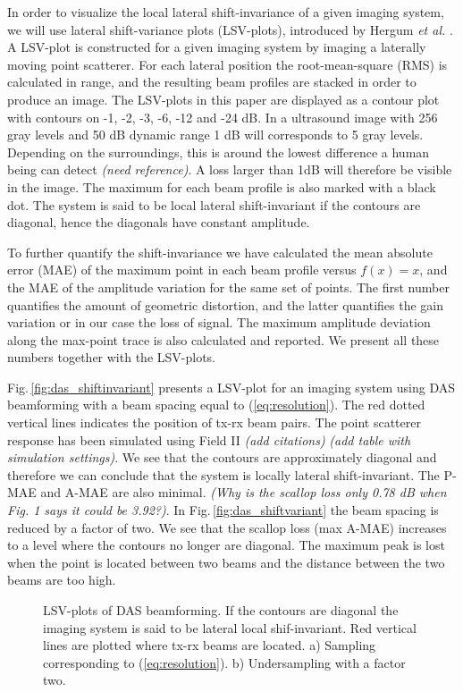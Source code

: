 \documentclass[journal]{IEEEtran}
\newcommand{\img}{img/}
\newcommand\comment[1]{\textit{{\color{red}(#1)}}}
\begin{document}
In order to visualize the local lateral shift-invariance of a given imaging system, we will use lateral shift-variance plots (LSV-plots), introduced by Hergum \textit{et al.} \cite{Hergum2007}. A LSV-plot is constructed for a given imaging system by imaging a laterally moving point scatterer. For each lateral position the root-mean-square (RMS) is calculated in range, and the resulting beam profiles are stacked in order to produce an image. The LSV-plots in this paper are displayed as a contour plot with contours on -1, -2, -3, -6, -12 and -24 dB. In a ultrasound image with 256 gray levels and 50 dB dynamic range 1 dB will corresponds to 5 gray levels. Depending on the surroundings, this is around the lowest difference a human being can detect \comment{need reference}. A loss larger than 1dB will therefore be visible in the image. The maximum for each beam profile is also marked with a black dot. The system is said to be local lateral shift-invariant if the contours are diagonal, hence the diagonals have constant amplitude.

To further quantify the shift-invariance we have calculated the mean absolute error (MAE) of the maximum point in each beam profile versus $f(x)=x$, and the MAE of the amplitude variation for the same set of points. The first number quantifies the amount of geometric distortion, and the latter quantifies the gain variation or in our case the loss of signal. The maximum amplitude deviation along the max-point trace is also calculated and reported. We present all these numbers together with the LSV-plots.

Fig.\,\ref{fig:das_shiftinvariant} presents a LSV-plot for an imaging system using DAS beamforming with a beam spacing equal to (\ref{eq:resolution}). The red dotted vertical lines indicates the position of tx-rx beam pairs. The point scatterer response has been simulated using Field II \comment{add citations} \comment{add table with simulation settings}. We see that the contours are approximately diagonal and therefore we can conclude that the system is locally lateral shift-invariant. The P-MAE and A-MAE are also minimal. \comment{Why is the scallop loss only 0.78 dB when Fig. 1 says it could be 3.92?}. In Fig.\,\ref{fig:das_shiftvariant} the beam spacing is reduced by a factor of two. We see that the scallop loss (max A-MAE) increases to a level where the contours no longer are diagonal. The maximum peak is lost when the point is located between two beams and the distance between the two beams are too high.

\begin{figure*}[!t]
\centerline{
\hfill{}
}
\caption{LSV-plots of DAS beamforming. If the contours are diagonal the imaging system is said to be lateral local shif-invariant. Red vertical lines are plotted where tx-rx beams are located. a) Sampling corresponding to (\ref{eq:resolution}). b) Undersampling with a factor two.}
\label{fig:das}
\end{figure*}
\end{document}
